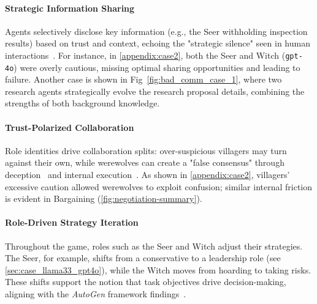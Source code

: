 \paragraph{\textbf{Strategic Information Sharing}} Agents selectively disclose key information (e.g., the Seer withholding inspection results) based on trust and context, echoing the "strategic silence" seen in human interactions~\citep{Park2023}. For instance, in \ref{appendix:case2}, both the Seer and Witch (\texttt{gpt-4o}) were overly cautious, missing optimal sharing opportunities and leading to failure. Another case is shown in Fig~\ref{fig:bad_comm_case_1}, where two research agents strategically evolve the research proposal details, combining the strengths of both background knowledge.

\paragraph{\textbf{Trust-Polarized Collaboration}} Role identities drive collaboration splits: over-suspicious villagers may turn against their own, while werewolves can create a "false consensus" through deception~\citep{Fehr2000} and internal execution~\citep{Woolley2010}. As shown in \ref{appendix:case2}, villagers’ excessive caution allowed werewolves to exploit confusion; similar internal friction is evident in Bargaining (\ref{fig:negotiation-summary}).

\paragraph{\textbf{Role-Driven Strategy Iteration}} Throughout the game, roles such as the Seer and Witch adjust their strategies. The Seer, for example, shifts from a conservative to a leadership role (see \ref{sec:case_llama33_gpt4o}), while the Witch moves from hoarding to taking risks. These shifts support the notion that task objectives drive decision-making, aligning with the \textit{AutoGen} framework findings~\citep{Wu2023}.


